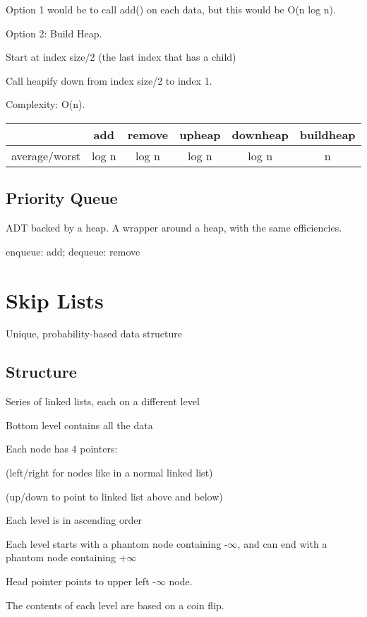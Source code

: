 \documentclass[english,openany]{book}
\begin{document}
	Option 1 would be to call add() on each data, but this would be O(n log n).

	Option 2: Build Heap.

	Start at index size/2 (the last index that has a child)

	Call heapify down from index size/2 to index 1.

	Complexity: O(n).

	\begin{tabular}{c|ccccc}
		 &add&remove&upheap&downheap&buildheap\\
		\hline
		average/worst&log n&log n&log n &log n &n\\
	\end{tabular}

	\section{Priority Queue}

	ADT backed by a heap. A wrapper around a heap, with the same efficiencies.

	enqueue: add; dequeue: remove

	\chapter{Skip Lists}

    Unique, probability-based data structure\\

    \section{Structure}

    Series of linked lists, each on a different level

    Bottom level contains all the data

    Each node has 4 pointers:

     (left/right for nodes like in a normal linked list)

     (up/down to point to linked list above and below)

    Each level is in ascending order

    Each level starts with a phantom node containing -$\infty$, and can end with a phantom node containing +$\infty$

    Head pointer points to upper left -$\infty$ node.

    The contents of each level are based on a coin flip.
\end{document}
